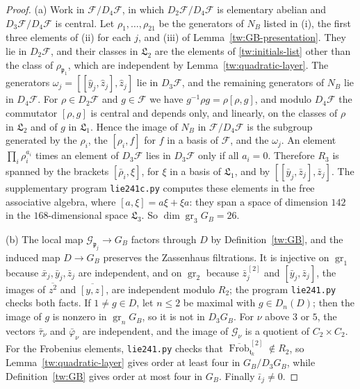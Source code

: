 \documentclass[11pt]{amsart}
\numberwithin{equation}{section}
\theoremstyle{definition}
\theoremstyle{remark}
\DeclareMathOperator{\Frob}{Frob}
\begin{document}
\begin{proof}
(a) Work in $\mathcal F/D_4\mathcal F$, in which $D_2\mathcal F/D_4\mathcal F$
is elementary abelian and $D_3\mathcal F/D_4\mathcal F$ is central. Let
$\rho_1,\dots,\rho_{21}$ be the generators of $N_B$ listed in (i), the first
three elements of (ii) for each $j$, and (iii) of
Lemma~\ref{tw:GB-presentation}. They lie in $D_2\mathcal F$, and their classes
in $\mathfrak L_2$ are the elements of \eqref{tw:initials-list} other than the
class of $\rho_{\mathfrak p_1}$, which are independent by
Lemma~\ref{tw:quadratic-layer}. The generators
$\omega_j=[[\hat y_j,\hat z_j],\hat z_j]$ lie in $D_3\mathcal F$, and the
remaining generators of $N_B$ lie in $D_4\mathcal F$. For $\rho\in D_2\mathcal F$ and $g\in\mathcal F$ we have
$g^{-1}\rho g=\rho[\rho,g]$, and modulo $D_4\mathcal F$ the commutator
$[\rho,g]$ is central and depends only, and linearly, on the classes of
$\rho$ in $\mathfrak L_2$ and of $g$ in $\mathfrak L_1$. Hence the image of
$N_B$ in $\mathcal F/D_4\mathcal F$ is the subgroup generated by the $\rho_i$,
the $[\rho_i,f]$ for $f$ in a basis of $\mathcal F$, and the $\omega_j$. An
element $\prod_i\rho_i^{a_i}$ times an element of $D_3\mathcal F$ lies in
$D_3\mathcal F$ only if all $a_i=0$. Therefore $R_3$ is spanned by the
brackets $[\bar\rho_i,\xi]$, for $\xi$ in a basis of $\mathfrak L_1$, and by
$[[\bar y_j,\bar z_j],\bar z_j]$. The supplementary program
\texttt{lie241c.py} computes these elements in the free associative algebra,
where $[a,\xi]=a\xi+\xi a$: they span a space of dimension $142$ in the
$168$-dimensional space $\mathfrak L_3$. So $\dim\operatorname{gr}_3G_B=26$.

(b) The local map $\mathcal G_{\mathfrak p_j}\to G_B$ factors through $D$ by
Definition~\ref{tw:GB}, and the induced map $D\to G_B$ preserves the
Zassenhaus filtrations. It is injective on $\operatorname{gr}_1$ because
$\bar x_j,\bar y_j,\bar z_j$ are independent, and on $\operatorname{gr}_2$
because $\bar z_j^{\,[2]}$ and $[\bar y_j,\bar z_j]$, the images of
$\overline{z^2}$ and $\overline{[y,z]}$, are independent modulo $R_2$; the
program \texttt{lie241.py} checks both facts. If $1\neq g\in D$, let $n\le2$
be maximal with $g\in D_n(D)$; then the image of $g$ is nonzero in
$\operatorname{gr}_nG_B$, so it is not in $D_3G_B$. For $\nu$ above $3$ or
$5$, the vectors $\bar\tau_\nu$ and $\bar\varphi_\nu$ are independent, and the
image of $\mathcal G_\nu$ is a quotient of $C_2\times C_2$. For the Frobenius
elements, \texttt{lie241.py} checks that
$\overline{\Frob}_{\mathfrak t_k}^{\,[2]}\notin R_2$, so
Lemma~\ref{tw:quadratic-layer} gives order at least four in $G_B/D_3G_B$,
while Definition~\ref{tw:GB} gives order at most four in $G_B$. Finally
$\bar\iota_j\neq0$.


\end{proof}
\end{document}
